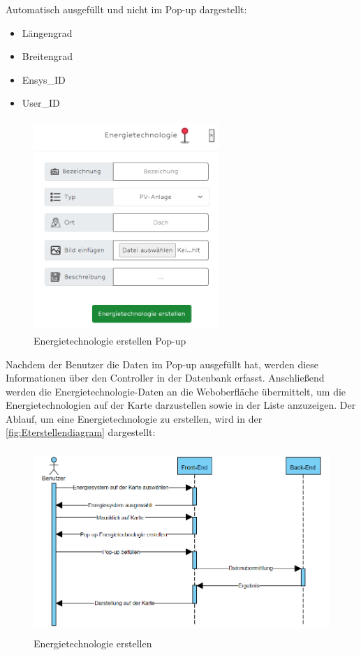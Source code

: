 Automatisch ausgefüllt und nicht im Pop-up dargestellt:
\begin{itemize}
	\item Längengrad 
	\item Breitengrad
	\item Ensys\_ID
	\item User\_ID
\end{itemize}
\begin{figure}[h]
	\centering
	\includegraphics[height=8cm,width=7cm]{images/ETerstellenPop}
	\caption{Energietechnologie erstellen Pop-up}
	\label{fig:EterstellenPop}
\end{figure}
\newpage
Nachdem der Benutzer die Daten im Pop-up ausgefüllt hat, werden diese Informationen über den Controller in der Datenbank erfasst. Anschließend werden die Energietechnologie-Daten an die Weboberfläche übermittelt, um die Energietechnologien auf der Karte darzustellen sowie in der Liste anzuzeigen. Der Ablauf, um eine Energietechnologie zu erstellen, wird in der \autoref{fig:Eterstellendiagram} dargestellt:
 \begin{figure}[h]
 	\centering
 	\includegraphics[height=7cm,width=14cm]{images/ETerstellen}
 	\caption{Energietechnologie erstellen}
 	\label{fig:Eterstellendiagram}
 \end{figure}


